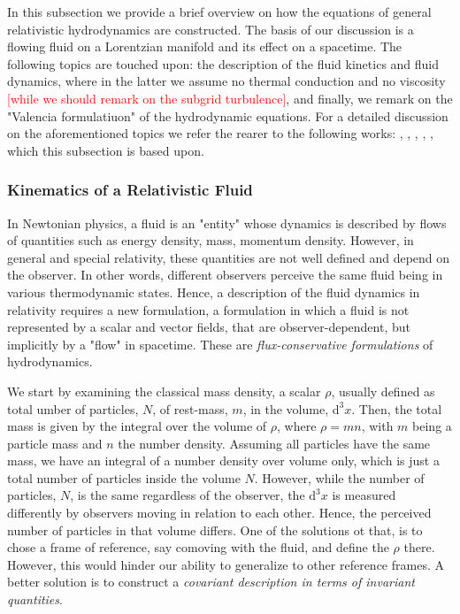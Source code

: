 \documentclass[11pt,a4paper,headinclude=true,DIV=14,BCOR=8mm,chapterprefix,listof=totoc,twoside,openright,abstracton]{scrbook}
\newcommand{\red}[1]{\textcolor{red}{#1}}
\begin{document}
In this subsection we provide a brief overview on how the equations of general relativistic hydrodynamics are constructed. The basis of our discussion is a flowing fluid on a Lorentzian manifold and its effect on a spacetime. The following topics are touched upon: the description of the fluid kinetics and fluid dynamics, where in the latter we assume no thermal conduction and no viscosity \red{[while we should remark on the subgrid turbulence]}, and finally, we remark on the "Valencia formulatiuon" of the hydrodynamic equations. For a detailed discussion on the aforementioned topics we refer the rearer to the following works: \cite{Misner:1973}, \cite{Schutz:2009a}, \cite{Gourgoulhon:2006bn}, \cite{Andersson:2006nr}, \cite{Rezzolla:2013}, which this subsection is based upon.


\subsubsection{Kinematics of a Relativistic Fluid}

In Newtonian physics, a fluid is an "entity" whose dynamics is described by flows of quantities such as energy density, mass, momentum density. However, in general and special relativity, these quantities are not well defined and depend on the observer. In other words, different observers perceive the same fluid being in various thermodynamic states. Hence, a description of the fluid dynamics in relativity requires a new formulation, a formulation in which a fluid is not represented by a scalar and vector fields, that are observer-dependent, but implicitly by a "flow" in spacetime. These are \textit{flux-conservative formulations} of hydrodynamics.

We start by examining the classical mass density, a scalar $\rho$, usually defined as total umber of particles, $N$, of rest-mass, $m$, in the volume, $\text{d}^3x$. Then, the total mass is given by the integral over the volume of $\rho$, where $\rho=mn$, with $m$ being a particle mass and $n$ the number density. Assuming all particles have the same mass, we have an integral of a number density over volume only, which is just a total number of particles inside the volume $N$. 
However, while the number of particles, $N$, is the same regardless of the observer, the $\text{d}^3x$ is measured differently by observers moving in relation to each other. Hence, the perceived number of particles in that volume differs. One of the solutions ot that, is to chose a frame of reference, say comoving with the fluid, and define the $\rho$ there. However, this would hinder our ability to generalize to other reference frames. A better solution is to construct a \textit{covariant description in terms of invariant quantities}. 
\end{document}
